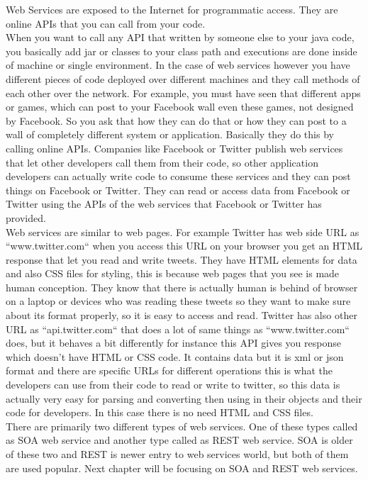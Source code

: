 Web Services are exposed to the Internet for programmatic access. They are online APIs that you can call from your code.\\
When you want to call any API that written by someone else to your java code, you basically add jar or classes to
your class path and executions are done inside of machine or single environment. In the case of web services however
you have different pieces of code deployed over different machines and they call methods of each other over the network.
For example, you must have seen that different apps or games, which can post to your Facebook wall even these games,
not designed by Facebook. So you ask that how they can do that or how they can post to a wall of completely different
system or application. Basically they do this by calling online APIs. Companies like Facebook or Twitter publish web
services that let other developers call them from their code, so other application developers can actually write
code to consume these services and they can post things on Facebook or Twitter. They can read or access data from
Facebook or Twitter using the APIs of the web services that Facebook or Twitter has provided.\\
Web services are similar to web pages. For example Twitter has web side URL as “www.twitter.com“ when you access
this URL on your browser you get an HTML response that let you read and write tweets. They have HTML elements for
data and also CSS files for styling, this is because web pages that you see is made human conception.
They know that there is actually human is behind of browser on a laptop or devices who was reading these tweets
so they want to make sure about its format properly, so it is easy to access and read.
Twitter has also other URL as “api.twitter.com“ that does a lot of same things as “www.twitter.com“ does,
but it behaves a bit differently for instance this API gives you response which doesn’t have HTML or CSS code.
It contains data but it is xml or json format and there are specific URLs for different operations this is what
the developers can use from their code to read or write to twitter, so this data is actually very easy for
parsing and converting then using in their objects and their code for developers. In this case there is no need HTML
and CSS files.\\
There are primarily two different types of web services. One of these types called as SOA web service and another type
called as REST web service. SOA is older of these two and REST is newer entry to web services world, but both of them
are used popular. Next chapter will be focusing on SOA and REST web services.

